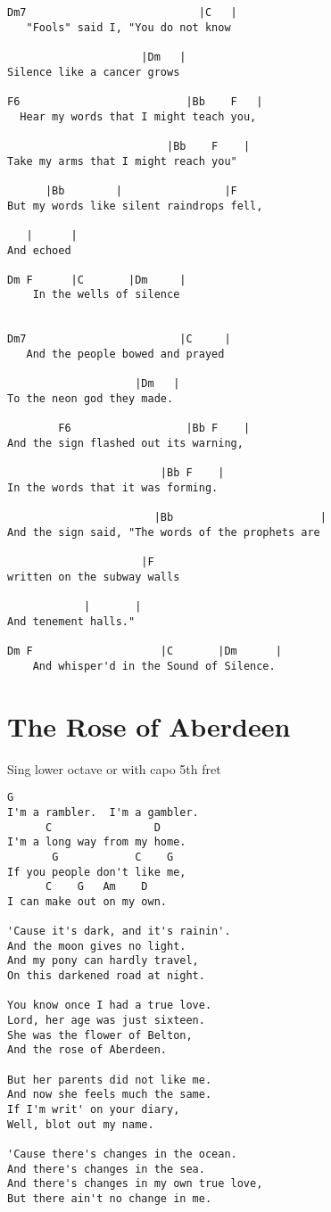 \documentclass[leqno]{memoir}
\begin{document}
\begin{verbatim}
Dm7                           |C   |
   "Fools" said I, "You do not know

                     |Dm   |
Silence like a cancer grows

F6                          |Bb    F   |
  Hear my words that I might teach you,

                         |Bb    F    |
Take my arms that I might reach you"

      |Bb        |                |F
But my words like silent raindrops fell,

   |      |
And echoed

Dm F      |C       |Dm     |
    In the wells of silence


Dm7                        |C     |
   And the people bowed and prayed

                    |Dm   |
To the neon god they made.

        F6                  |Bb F    |
And the sign flashed out its warning,

                        |Bb F    |
In the words that it was forming.

                       |Bb                       |
And the sign said, "The words of the prophets are 

                     |F
written on the subway walls

            |       |
And tenement halls."

Dm F                    |C       |Dm      |
    And whisper'd in the Sound of Silence. 
\end{verbatim}
\newpage


\chapter{The Rose of Aberdeen}
Sing lower octave or with capo 5th fret
\begin{verbatim}
G
I'm a rambler.  I'm a gambler.
      C                D
I'm a long way from my home.
       G            C    G
If you people don't like me,
      C    G   Am    D
I can make out on my own.

'Cause it's dark, and it's rainin'.
And the moon gives no light.
And my pony can hardly travel,
On this darkened road at night.

You know once I had a true love.
Lord, her age was just sixteen.
She was the flower of Belton,
And the rose of Aberdeen.

But her parents did not like me.
And now she feels much the same.
If I'm writ' on your diary,
Well, blot out my name.

'Cause there's changes in the ocean.
And there's changes in the sea.
And there's changes in my own true love,
But there ain't no change in me.
\end{verbatim}
\newpage
\end{document}
